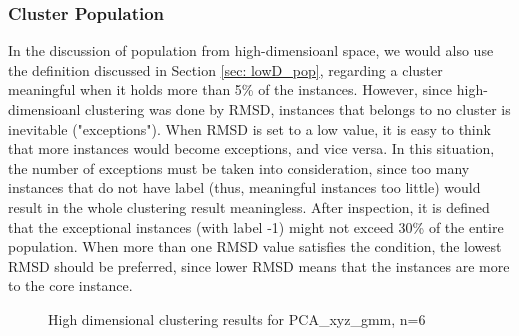 \documentclass[a4paper]{article}
\begin{document}
\subsubsection{Cluster Population}
In the discussion of population from high-dimensioanl space, we would also use the definition discussed in Section \ref{sec: lowD_pop}, regarding a cluster meaningful when it holds more than 5\% of the instances. However, since high-dimensioanl clustering was done by RMSD, instances that belongs to no cluster is inevitable ("exceptions"). When RMSD is set to a low value, it is easy to think that more instances would become exceptions, and vice versa. In this situation, the number of exceptions must be taken into consideration, since too many instances that do not have label (thus, meaningful instances too little) would result in the whole clustering result meaningless. After inspection, it is defined that the exceptional instances (with label -1) might not exceed 30\% of the entire population. When more than one RMSD value satisfies the condition, the lowest RMSD should be preferred, since lower RMSD means that the instances are more to the core instance.

\begin{figure}[H]
    \centering
    \caption{High dimensional clustering results for PCA\_xyz\_gmm, n=6}
    \label{fig: HighD_failure}
\end{figure}
\end{document}
